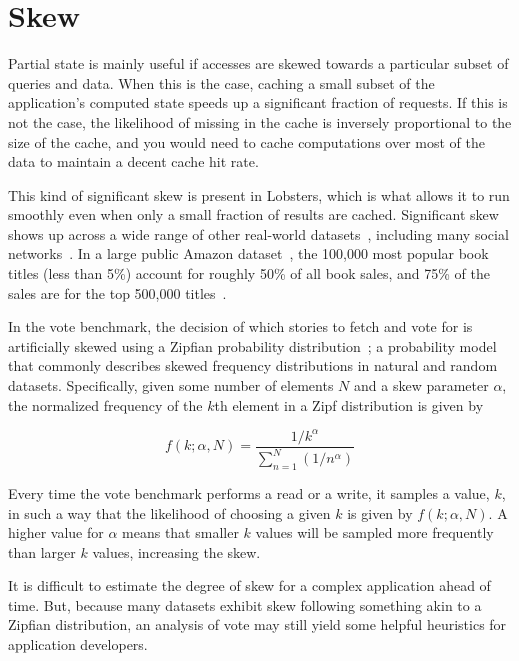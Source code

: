 \section{Skew}
\label{s:eval:patterns}

Partial state is mainly useful if accesses are skewed towards a particular
subset of queries and data. When this is the case, caching a small subset of the
application's computed state speeds up a significant fraction of requests. If
this is not the case, the likelihood of missing in the cache is inversely
proportional to the size of the cache, and you would need to cache computations
over most of the data to maintain a decent cache hit rate.

This kind of significant skew is present in Lobsters, which is what allows it to
run smoothly even when only a small fraction of results are cached. Significant
skew shows up across a wide range of other real-world
datasets~\cite{power1,power2,network-skew,large-skew-analysis}, including many
social networks~\cite{network-skew2, community-skew}. In a large public Amazon
dataset~\cite{amazon-skew}, the 100,000 most popular book titles (less than 5\%)
account for roughly 50\% of all book sales, and 75\% of the sales are for the
top 500,000 titles~\cite{zhang2020permutation}.

In the vote benchmark, the decision of which stories to fetch and vote for is
artificially skewed using a Zipfian probability distribution~\cite{zipf}; a
probability model that commonly describes skewed frequency distributions in
natural and random datasets. Specifically, given some number of elements $N$ and
a skew parameter $\alpha$, the normalized frequency of the $k$th element in a
Zipf distribution is given by

\begin{displaymath}
  f\left(k;\alpha,N\right)={\frac {1/k^{\alpha}}{\sum \limits _{n=1}^{N}(1/n^{\alpha})}}
\end{displaymath}

Every time the vote benchmark performs a read or a write, it samples a value,
$k$, in such a way that the likelihood of choosing a given $k$ is given by
$f\left(k;\alpha,N\right)$. A higher value for $\alpha$ means that smaller $k$
values will be sampled more frequently than larger $k$ values, increasing the
skew.

It is difficult to estimate the degree of skew for a complex application ahead
of time. But, because many datasets exhibit skew following something akin to a
Zipfian distribution, an analysis of vote may still yield some helpful
heuristics for application developers.

